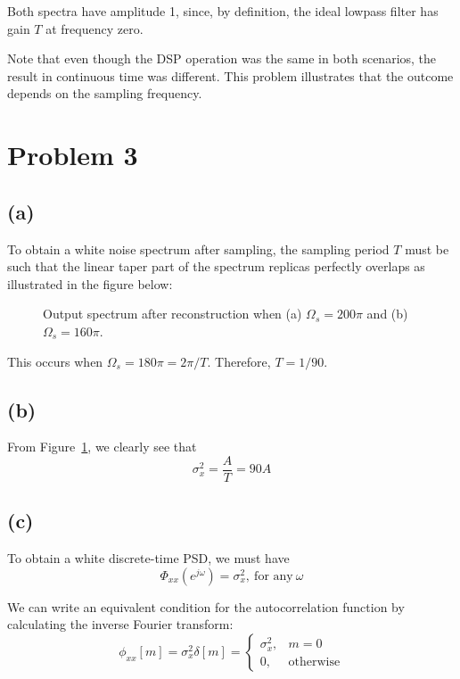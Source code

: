 \documentclass{article}
\begin{document}
Both spectra have amplitude 1, since, by definition, the ideal lowpass filter has gain $T$ at frequency zero.	
	
Note that even though the DSP operation was the same in both scenarios, the result in continuous time was different. This problem illustrates that the outcome depends on the sampling frequency.
	
\section{Problem 3}
\subsection{(a)}
To obtain a white noise spectrum after sampling, the sampling period $T$ must be such that the linear taper part of the spectrum replicas perfectly overlaps as illustrated in the figure below:

\begin{figure}[h!]
	\centering
	\resizebox{0.8\textwidth}{!}{}
	\caption{Output spectrum after reconstruction when (a) $\Omega_s = 200\pi$ and (b) $\Omega_s = 160\pi$.}
	\label{fig:linear_taper}
\end{figure}

This occurs when $\Omega_s = 180\pi = 2\pi/T$. Therefore, $T = 1/90$.

\subsection{(b)}

From Figure~\ref{fig:linear_taper}, we clearly see that
\begin{equation}
\sigma_x^2 = \frac{A}{T} = 90A
\end{equation}

\subsection{(c)}

To obtain a white discrete-time PSD, we must have
\begin{equation}
\Phi_{xx}(e^{j\omega}) =\sigma_x^2, ~\text{for any}~\omega
\end{equation}

We can write an equivalent condition for the autocorrelation function by calculating the inverse Fourier transform:
\begin{equation}
\phi_{xx}[m] = \sigma_x^2\delta[m] = \begin{cases}
\sigma_x^2, & m = 0 \\
0, & \text{otherwise}
\end{cases}
\end{equation}
\end{document}
